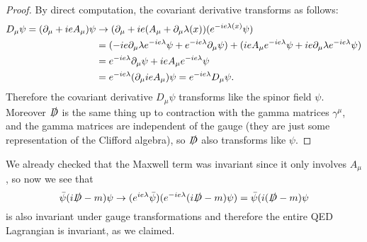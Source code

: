 \begin{proof}
By direct computation, the covariant derivative transforms as follows:
\begin{align*}
    D_\mu \psi = (\partial_\mu+ie A_\mu)\psi &\to (\partial_\mu+ie (A_\mu+\partial_\mu \lambda(x))(e^{-ie\lambda(x)}\psi)\\
    &=(-ie \partial_\mu \lambda e^{-ie\lambda} \psi + e^{-ie\lambda} \partial_\mu \psi)+(ie A_\mu e^{-ie\lambda} \psi + ie \partial_\mu \lambda e^{-ie\lambda}\psi)\\
    &= e^{-ie\lambda} \partial_\mu \psi+ie A_\mu e^{-ie\lambda} \psi\\
    &= e^{-ie \lambda} (\partial_\mu ie A_\mu)\psi = e^{-ie\lambda} D_\mu \psi.
\end{align*}
Therefore the covariant derivative $D_\mu \psi$ transforms like the spinor field $\psi$. Moreover $\slashed{D}$ is the same thing up to contraction with the gamma matrices $\gamma^\mu$, and the gamma matrices are independent of the gauge (they are just some representation of the Clifford algebra), so $\slashed{D}$ also transforms like $\psi$.
\end{proof}

We already checked that the Maxwell term was invariant since it only involves $A_\mu$, so now we see that 
\begin{equation}
    \bar \psi (i\slashed{D}-m)\psi \to (e^{ie\lambda}\bar \psi)(e^{-ie\lambda} (i\slashed{D}-m)\psi)=\bar \psi (i(\slashed{D}-m)\psi
\end{equation}
is also invariant under gauge transformations and therefore the entire QED Lagrangian is invariant, as we claimed.

